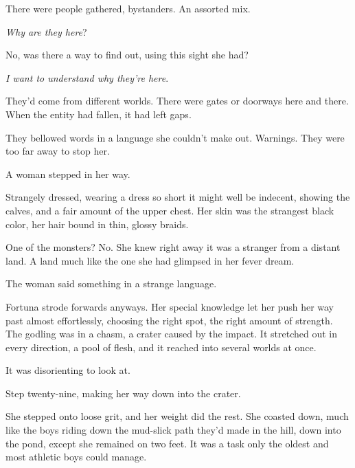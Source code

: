 There were people gathered, bystanders.  An assorted mix.



\emph{Why are they here}?



No, was there a way to find out, using this sight she had?



\emph{I want to understand why they're here}.



They'd come from different worlds.  There were gates or doorways here and there.  When the entity had fallen, it had left gaps.



They bellowed words in a language she couldn't make out.  Warnings.  They were too far away to stop her.



A woman stepped in her way.



Strangely dressed, wearing a dress so short it might well be indecent, showing the calves, and a fair amount of the upper chest.  Her skin was the strangest black color, her hair bound in thin, glossy braids.



One of the monsters?  No.  She knew right away it was a stranger from a distant land.  A land much like the one she had glimpsed in her fever dream.



The woman said something in a strange language.



Fortuna strode forwards anyways.  Her special knowledge let her push her way past almost effortlessly, choosing the right spot, the right amount of strength.  The godling was in a chasm, a crater caused by the impact.  It stretched out in every direction, a pool of flesh, and it reached into several worlds at once.



It was disorienting to look at.



Step twenty-nine, making her way down into the crater.



She stepped onto loose grit, and her weight did the rest.  She coasted down, much like the boys riding down the mud-slick path they'd made in the hill, down into the pond, except she remained on two feet.  It was a task only the oldest and most athletic boys could manage.



